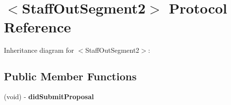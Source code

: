 \hypertarget{protocol_staff_out_segment2-p}{
\section{$<$\-Staff\-Out\-Segment2$>$ \-Protocol \-Reference}
\label{protocol_staff_out_segment2-p}
}


\-Inheritance diagram for $<$\-Staff\-Out\-Segment2$>$\-:
\subsection*{\-Public \-Member \-Functions}
\begin{DoxyCompactItemize}
\item 
\hypertarget{protocol_staff_out_segment2-p_a4a06d94432843c5944bcb41a86a14a20}{
(void) -\/ {\bfseries did\-Submit\-Proposal}}
\label{protocol_staff_out_segment2-p_a4a06d94432843c5944bcb41a86a14a20}

\end{DoxyCompactItemize}
